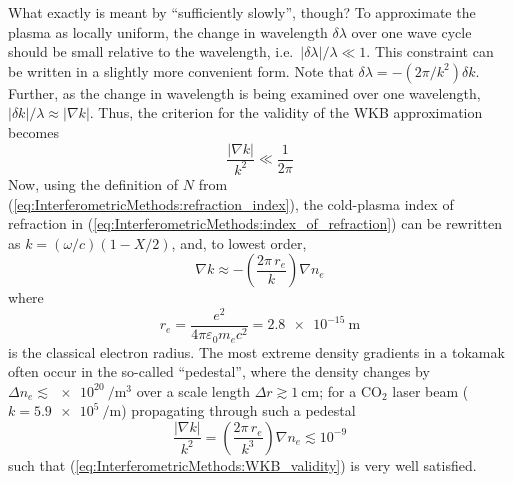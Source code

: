 What exactly is meant by ``sufficiently slowly'', though?
To approximate the plasma as locally uniform,
the change in wavelength $\delta \lambda$ over one wave cycle
should be small relative to the wavelength,
i.e.\ $|\delta \lambda| / \lambda \ll 1$.
This constraint can be written in a slightly more convenient form.
Note that $\delta \lambda = - (2 \pi / k^2) \delta k $.
Further, as the change in wavelength is being examined over one wavelength,
$|\delta k| / \lambda \approx |\nabla k|$.
Thus, the criterion for the validity of the WKB approximation becomes
\begin{equation}
  \frac{|\nabla k|}{k^2} \ll \frac{1}{2 \pi}
  \label{eq:InterferometricMethods:WKB_validity}
\end{equation}
Now, using the definition of $N$ from
(\ref{eq:InterferometricMethods:refraction_index}),
the cold-plasma index of refraction in
(\ref{eq:InterferometricMethods:index_of_refraction})
can be rewritten as $k = (\omega / c) (1 - X / 2)$, and, to lowest order,
\begin{equation}
  \nabla k
  \approx
  -\left( \frac{2 \pi \, r_e}{k} \right) \nabla n_e
\end{equation}
where
\begin{equation}
  r_e
  =
  \frac{e^2}{4 \pi \varepsilon_0 m_e c^2}
  =
  \SI{2.8e-15}{\meter}
  \label{eq:InterferometricMethods:classical_electron_radius}
\end{equation}
is the classical electron radius.
The most extreme density gradients in a tokamak
often occur in the so-called ``pedestal'',
where the density changes by
$\Delta n_e \lesssim \SI{e20}{\per\meter\cubed}$
over a scale length $\Delta r \gtrsim \SI{1}{\centi\meter}$;
for a CO$_2$ laser beam ($k = \SI{5.9e5}{\per\meter}$)
propagating through such a pedestal
\begin{equation}
  \frac{|\nabla k|}{k^2}
  =
  \left( \frac{2 \pi \, r_e}{k^3} \right) \nabla n_e
  \lesssim
  10^{-9}
\end{equation}
such that (\ref{eq:InterferometricMethods:WKB_validity})
is very well satisfied.


